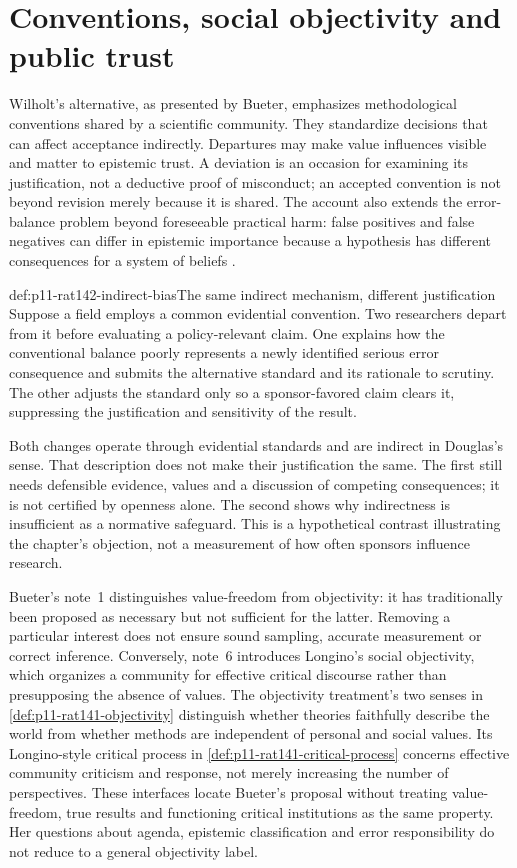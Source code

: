 \section{Conventions, social objectivity and public trust}
\label{sec:p11-rat142-objectivity}

Wilholt's alternative, as presented by Bueter, emphasizes methodological
conventions shared by a scientific community. They standardize decisions
that can affect acceptance indirectly. Departures may make value influences
visible and matter to epistemic trust. A deviation is an occasion for
examining its justification, not a deductive proof of misconduct; an accepted
convention is not beyond revision merely because it is shared. The account
also extends the error-balance problem beyond foreseeable practical harm:
false positives and false negatives can differ in epistemic importance
because a hypothesis has different consequences for a system of beliefs
\cite[p.~762]{Bueter2021ValueFreedom}.

\begin{hbexample}{def:p11-rat142-indirect-bias}{The same indirect mechanism, different justification}
Suppose a field employs a common evidential convention. Two researchers
depart from it before evaluating a policy-relevant claim. One explains how
the conventional balance poorly represents a newly identified serious
error consequence and submits the alternative standard and its rationale
to scrutiny. The other adjusts the standard only so a sponsor-favored
claim clears it, suppressing the justification and sensitivity of the result.

Both changes operate through evidential standards and are indirect in
Douglas's sense. That description does not make their justification the
same. The first still needs defensible evidence, values and a discussion
of competing consequences; it is not certified by openness alone. The
second shows why indirectness is insufficient as a normative safeguard.
This is a hypothetical contrast illustrating the chapter's objection,
not a measurement of how often sponsors influence research.
\end{hbexample}

Bueter's note~1 distinguishes value-freedom from objectivity: it has
traditionally been proposed as necessary but not sufficient for the latter.
Removing a particular interest does not ensure sound sampling, accurate
measurement or correct inference. Conversely, note~6 introduces Longino's
social objectivity, which organizes a community for effective critical
discourse rather than presupposing the absence of values. The objectivity
treatment's two senses in \cref{def:p11-rat141-objectivity} distinguish
whether theories faithfully describe the world from whether methods are
independent of personal and social values. Its Longino-style critical
process in \cref{def:p11-rat141-critical-process} concerns effective
community criticism and response, not merely increasing the number of
perspectives. These interfaces locate Bueter's proposal without treating
value-freedom, true results and functioning critical institutions as the
same property. Her questions about agenda, epistemic classification and
error responsibility do not reduce to a general objectivity label.


